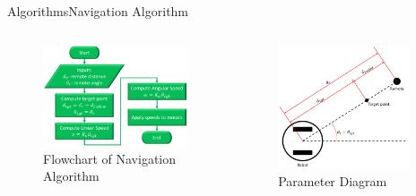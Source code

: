 \documentclass{beamer}
\begin{document}
\begin{frame}{Algorithms}{Navigation Algorithm}
  \begin{columns}
      \begin{figure}
        \centering
        \includegraphics[width=\textwidth]{figs/navigationAlgorithmFlowchart.pdf}
        \caption{Flowchart of Navigation Algorithm}
      \end{figure}
      \begin{figure}
        \centering
        \includegraphics[width=0.9\textwidth]{figs/navigationAlgorithmDiagram.pdf}
        \caption{Parameter Diagram}
      \end{figure}
  \end{columns}
\end{frame}
\end{document}
